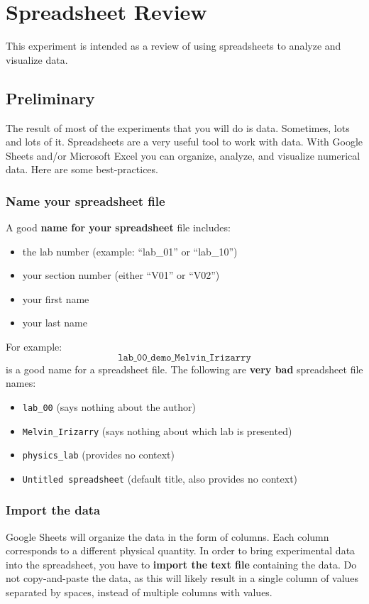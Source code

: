 \setcounter{chapter}{-1}
\chapter{Spreadsheet Review}
%
This experiment is intended as a review of using spreadsheets to analyze and visualize data.
%
\section{Preliminary}
%
The result of most of the experiments that you will do is data. Sometimes, lots and lots of it. Spreadsheets are a very useful tool to work with data. With Google Sheets and/or Microsoft Excel you can organize, analyze, and visualize numerical data. Here are some best-practices.
%
\subsection{Name your spreadsheet file}
%
A good \textbf{name for your spreadsheet} file includes:
\begin{itemize}
    \item the lab number (example: ``lab\_01'' or ``lab\_10'')
    \item your section number (either ``V01'' or ``V02'')
    \item your first name
    \item your last name
\end{itemize}
For example:
\begin{equation}
    \texttt{lab\_00\_demo\_Melvin\_Irizarry}
\end{equation}
is a good name for a spreadsheet file. The following are \textbf{very bad} spreadsheet file names:
\begin{itemize}
    \item \texttt{lab\_00} (says nothing about the author)
    \item \texttt{Melvin\_Irizarry} (says nothing about which lab is presented)
    \item \texttt{physics\_lab} (provides no context)
    \item \texttt{Untitled spreadsheet} (default title, also provides no context)
\end{itemize}
%
\subsection{Import the data}
%
Google Sheets will organize the data in the form of columns. Each column corresponds to a different physical quantity. In order to bring experimental data into the spreadsheet, you have to \textbf{import the text file} containing the data. Do not copy-and-paste the data, as this will likely result in a single column of values separated by spaces, instead of multiple columns with values.

